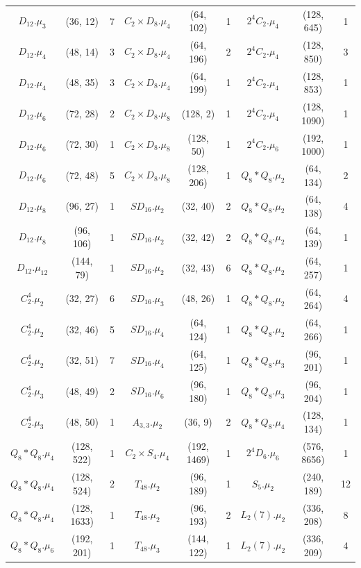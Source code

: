 \documentclass[a4paper]{amsart}
\theoremstyle{definition}
\theoremstyle{plain}
\begin{document}
{\begin{longtable}{ccc|ccc|ccc}
\rowcolor{lightgray}
$D_{12}.\mu_{3}$&(36, 12)&7 & $C_2 \times D_8.\mu_{4}$&(64, 102)&1 & $2^4C_2.\mu_{4}$&(128, 645)&1\\
$D_{12}.\mu_{4}$&(48, 14)&3 & $C_2 \times D_8.\mu_{4}$&(64, 196)&2 & $2^4C_2.\mu_{4}$&(128, 850)&3\\
\rowcolor{lightgray}
 $D_{12}.\mu_{4}$&(48, 35)&3 & $C_2 \times D_8.\mu_{4}$&(64, 199)&1 & $2^4C_2.\mu_{4}$&(128, 853)&1\\
$D_{12}.\mu_{6}$&(72, 28)&2 & $C_2 \times D_8.\mu_{8}$&(128, 2)&1 & $2^4C_2.\mu_{4}$&(128, 1090)&1\\
\rowcolor{lightgray}
$D_{12}.\mu_{6}$&(72, 30)&1 & $C_2 \times D_8.\mu_{8}$&(128, 50)&1 & $2^4C_2.\mu_{6}$&(192, 1000)&1\\
$D_{12}.\mu_{6}$&(72, 48)&5 & $C_2 \times D_8.\mu_{8}$&(128, 206)&1 & $Q_8 * Q_8.\mu_{2}$&(64, 134)&2\\
\rowcolor{lightgray}
$D_{12}.\mu_{8}$&(96, 27)&1 & $SD_{16}.\mu_{2}$&(32, 40)&2 & $Q_8 * Q_8.\mu_{2}$&(64, 138)&4\\
$D_{12}.\mu_{8}$&(96, 106)&1 & $SD_{16}.\mu_{2}$&(32, 42)&2 & $Q_8 * Q_8.\mu_{2}$&(64, 139)&1\\
\rowcolor{lightgray}
$D_{12}.\mu_{12}$&(144, 79)&1 & $SD_{16}.\mu_{2}$&(32, 43)&6 & $Q_8 * Q_8.\mu_{2}$&(64, 257)&1\\
$C_2^4.\mu_{2}$&(32, 27)&6 & $SD_{16}.\mu_{3}$&(48, 26)&1 & $Q_8 * Q_8.\mu_{2}$&(64, 264)&4\\
\rowcolor{lightgray}
$C_2^4.\mu_{2}$&(32, 46)&5 & $SD_{16}.\mu_{4}$&(64, 124)&1 & $Q_8 * Q_8.\mu_{2}$&(64, 266)&1\\
$C_2^4.\mu_{2}$&(32, 51)&7 & $SD_{16}.\mu_{4}$&(64, 125)&1 & $Q_8 * Q_8.\mu_{3}$&(96, 201)&1\\
\rowcolor{lightgray}
$C_2^4.\mu_{3}$&(48, 49)&2 & $SD_{16}.\mu_{6}$&(96, 180)&1 & $Q_8 * Q_8.\mu_{3}$&(96, 204)&1\\
$C_2^4.\mu_{3}$&(48, 50)&1 & $A_{3,3}.\mu_{2}$&(36, 9)&2 & $Q_8 * Q_8.\mu_{4}$&(128, 134)&1\\
\rowcolor{lightgray}
$Q_8 * Q_8.\mu_{4}$&(128, 522)&1 & $C_2 \times S_4.\mu_{4}$&(192, 1469)&1 & $2^4D_6.\mu_{6}$&(576, 8656)&1\\
$Q_8 * Q_8.\mu_{4}$&(128, 524)&2 & $T_{48}.\mu_{2}$&(96, 189)&1 & $S_5.\mu_{2}$&(240, 189)&12\\
\rowcolor{lightgray}
$Q_8 * Q_8.\mu_{4}$&(128, 1633)&1 & $T_{48}.\mu_{2}$&(96, 193)&2 & $L_2(7).\mu_{2}$&(336, 208)&8\\
$Q_8 * Q_8.\mu_{6}$&(192, 201)&1 & $T_{48}.\mu_{3}$&(144, 122)&1 & $L_2(7).\mu_{2}$&(336, 209)&4\\

\end{longtable}}
\end{document}
